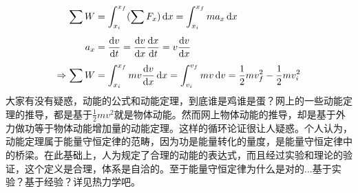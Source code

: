 \begin{prove}
\begin{equation}
    \begin{aligned}
 \sum W&=\int_{x_{i}}^{x_{f}}(\sum F_{x})\dif x=\int_{x_{i}}^{x_{f}} ma_{x}\dif x\\[1ex]
a_x&=\frac{\dif v}{\dif t}=\frac{\dif v}{\dif x}\frac{\dif x}{\dif t}=v\frac{\dif v}{\dif x}\\[1ex]
\Rightarrow\sum W&=\int_{x_{i}}^{x_{f}}mv\frac{\dif v}{\dif x}\dif x=\int_{v_{i}}^{v_{f}}mv\dif v=\frac{1}{2}mv_{f}^{2}-\frac{1}{2}mv_{i}^{2}
    \end{aligned}
    \nonumber
\end{equation}
大家有没有疑惑，动能的公式和动能定理，到底谁是鸡谁是蛋？网上的一些动能定理的推导，都是基于$\frac{1}{2}mv^{2} $就是物体动能。然而网上物体动能的推导，却是基于外力做功等于物体动能增加量的动能定理。这样的循环论证很让人疑惑。个人认为，动能定理属于能量守恒定律的范畴，因为功是能量转化的量度，是能量守恒定律中的桥梁。在此基础上，人为规定了合理的动能的表达式，而且经过实验和理论的验证，这个定义是合理，体系是自洽的。至于能量守恒定律为什么是对的...基于实验？基于经验？详见热力学吧。
\end{prove}


